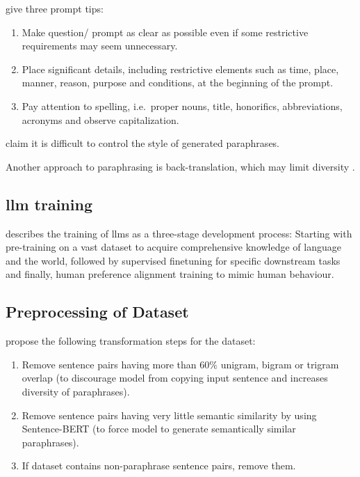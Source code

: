 \citet{fu_learning_2024} give three prompt tips:
\begin{enumerate}
    \item Make question/ prompt as clear as possible even if some restrictive requirements may seem unnecessary.
    \item Place significant details, including restrictive elements such as time, place, manner, reason, purpose and conditions, at the beginning of the prompt.
    \item Pay attention to spelling, i.e.\ proper nouns, title, honorifics, abbreviations, acronyms and observe capitalization.
\end{enumerate}

\citet{zhou_paraphrase_2021} claim it is difficult to control the style of generated paraphrases.

Another approach to paraphrasing is back-translation, which may limit diversity \citep{zhou_paraphrase_2025}.


\subsection{\ac{llm} training}

\citet{master_thesis_paraphrasing_2024} describes the training of \acp{llm} as a three-stage development process:
Starting with pre-training on a vast dataset to acquire comprehensive knowledge of language and the world, 
followed by supervised finetuning for specific downstream tasks and finally,
human preference alignment training to mimic human behaviour.

\subsection{Preprocessing of Dataset}

\citet{palivela_optimization_2021} propose the following transformation steps for the dataset:
\begin{enumerate}
    \item Remove sentence pairs having more than 60$\%$ unigram, bigram or trigram overlap 
    (to discourage model from copying input sentence and increases diversity of paraphrases).
    \item Remove sentence pairs having very little semantic similarity by using Sentence-BERT 
    (to force model to generate semantically similar paraphrases).
    \item If dataset contains non-paraphrase sentence pairs, remove them.   
\end{enumerate}

